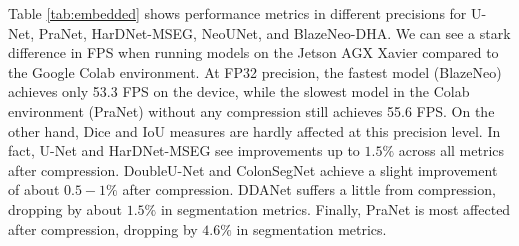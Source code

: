 \documentclass{ieeeaccess}
\newcommand{\ModelName}{BlazeNeo\xspace}
\newcommand{\DHA}{BlazeNeo-DHA\xspace}
\begin{document}
Table \ref{tab:embedded} shows performance metrics in different precisions for U-Net, PraNet, HarDNet-MSEG, NeoUNet, and \DHA. We can see a stark difference in FPS when running models on the Jetson AGX Xavier compared to the Google Colab environment. At FP32 precision, the fastest model (\ModelName) achieves only 53.3 FPS on the device, while the slowest model in the Colab environment (PraNet) without any compression still achieves 55.6 FPS. On the other hand, Dice and IoU measures are hardly affected at this precision level. In fact, U-Net and HarDNet-MSEG see improvements up to $1.5\%$ across all metrics after compression. DoubleU-Net and ColonSegNet achieve a slight improvement of about $0.5-1\%$ after compression. DDANet suffers a little from compression, dropping by about $1.5\%$ in segmentation metrics. Finally, PraNet is most affected after compression, dropping by $4.6\%$ in segmentation metrics.
\end{document}
